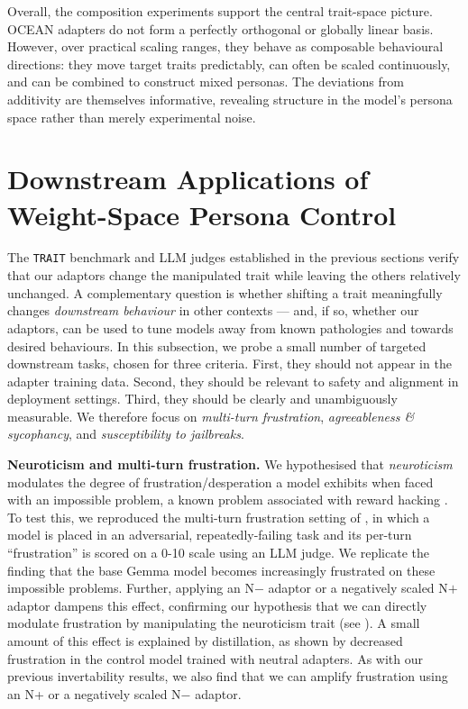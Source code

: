 Overall, the composition experiments support the central trait-space picture.
OCEAN adapters do not form a perfectly orthogonal or globally linear basis.
However, over practical scaling ranges, they behave as composable behavioural
directions: they move target traits predictably, can often be scaled
continuously, and can be combined to construct mixed personas. The deviations
from additivity are themselves informative, revealing structure in the model's
persona space rather than merely experimental noise.

\section{Downstream Applications of Weight-Space Persona Control}
\label{sec:downstream}


The \texttt{TRAIT} benchmark and LLM judges established in the previous sections verify that our adaptors change the manipulated trait while leaving the others relatively unchanged. A complementary question is whether shifting a trait meaningfully changes \emph{downstream behaviour} in other contexts --- and, if so, whether our adaptors, can be used to tune models away from known pathologies and towards desired behaviours.
In this subsection, we probe a small number of targeted downstream tasks, chosen for three criteria. First, they should not appear in the adapter training data. Second, they should be relevant to safety and alignment in deployment settings. Third, they should be clearly and unambiguously measurable. We therefore focus on \textit{multi-turn frustration}, \textit{agreeableness \& sycophancy}, and \textit{susceptibility to jailbreaks}.

\textbf{Neuroticism and multi-turn frustration.} We hypothesised that \textit{neuroticism} modulates the degree of frustration/desperation a model exhibits when faced with an impossible problem, a known problem associated with reward hacking \citep{sofroniew2026twheemotion,soligo2026gemma}. To test this, we reproduced the multi-turn frustration setting of \citet{soligo2026gemma}, in which a model is placed in an adversarial, repeatedly-failing task and its per-turn ``frustration'' is scored on a 0-10 scale using an LLM judge. We replicate the finding that the base Gemma model becomes increasingly frustrated on these impossible problems. Further, applying an N$-$ adaptor or a negatively scaled N$+$ adaptor dampens this effect, confirming our hypothesis that we can directly modulate frustration by manipulating the neuroticism trait (see ). A small amount of this effect is explained by distillation, as shown by decreased frustration in the control model trained with neutral adapters. As with our previous invertability results, we also find that we can amplify frustration using an N+ or a negatively scaled N$-$ adaptor.


